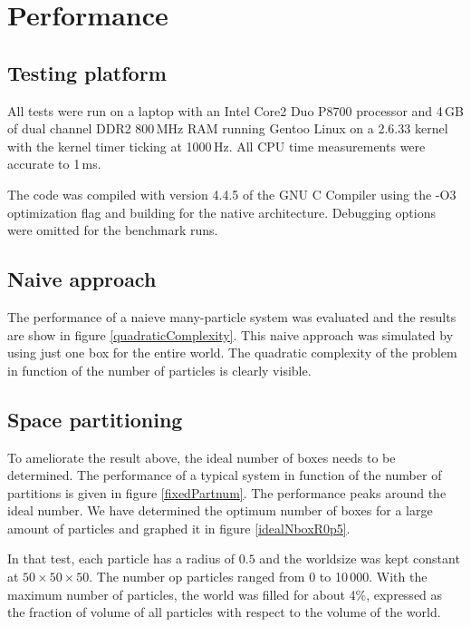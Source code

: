 \section{Performance}
\subsection{Testing platform}

All tests were run on a laptop with an Intel Core2 Duo P8700 processor and 
4\,GB of dual channel DDR2 800\,MHz RAM running Gentoo Linux on a 2.6.33 
kernel with the kernel timer ticking at 1000\,Hz. All CPU time measurements 
were accurate to 1\,ms.

The code was compiled with version 4.4.5 of the GNU C Compiler using the 
-O3 optimization flag and building for the native architecture. Debugging  
options were omitted for the benchmark runs.


\subsection{Naive approach}
The performance of a naieve many-particle system was evaluated and the 
results are show in figure \ref{quadraticComplexity}. This naive approach 
was simulated by using just one box for the entire world. The quadratic 
complexity of the problem in function of the number of particles is clearly 
visible.




\subsection{Space partitioning}
To ameliorate the result above, the ideal number of boxes needs to be 
determined.  The performance of a typical system in function of the number 
of partitions is given in figure \ref{fixedPartnum}. The performance peaks 
around the ideal number.  We have determined the optimum number of boxes 
for a large amount of particles and graphed it in figure 
	\ref{idealNboxR0p5}.

In that test, each particle has a radius of $0.5$ and the worldsize was 
kept constant at $50 \times 50 \times 50$. The number op particles ranged 
from 0 to 10\,000. With the maximum number of particles, the world was 
filled for about 4\%, expressed as the fraction of volume of all particles 
with respect to the volume of the world.

